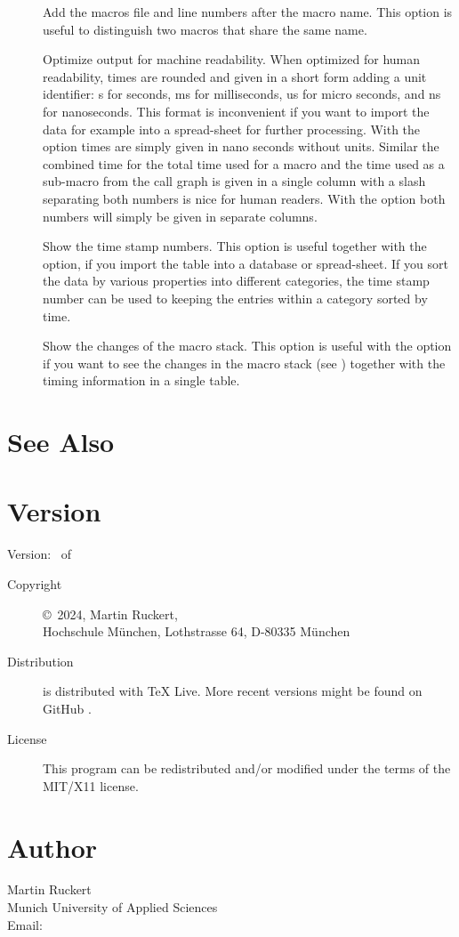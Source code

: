 \documentclass[a4paper,english]{article}
\begin{document}
\begin{description}
\item[]
  Add the macros file and line numbers after the macro name.
  This option is useful to distinguish two macros that share
  the same name.
\item[]
  Optimize output for machine readability. When optimized for human readability,
  times are rounded and given in a short form adding a unit identifier:
  s for seconds, ms for milliseconds, us for micro seconds, and ns for
  nanoseconds. This format is inconvenient if you want to import the data
  for example into a spread-sheet for further processing.
  With the  option times are simply given in nano seconds without units.
  Similar the combined time for the total time used for a macro and the
  time used as a sub-macro from the call graph is given in a single column
  with a slash separating both numbers is nice for human readers.
  With the  option both numbers will simply be given in separate columns.
  
\item[]
  Show the time stamp numbers. This option is useful together with
  the  option, if you import the table into a database or spread-sheet.
  If you sort the data by various properties into different
  categories, the time stamp number can be used to keeping the entries
   within a category sorted by time.
  
\item[]
  Show the changes of the macro stack.
  This option is useful with the  option if you want to see the changes
  in the macro stack (see ) together with the timing information in
  a single table.
\end{description}


\section{See Also}


\section{Version}
Version: \Version\  of \Date
\begin{description}
\item[Copyright] \copyright\ 2024, Martin Ruckert,\\
     Hochschule München, Lothstrasse 64, D-80335 München

\item[Distribution]
   is distributed with TeX Live.
  More recent versions might be found on GitHub
  .

\item[License] This program can be redistributed and/or modified under the
  terms of the MIT/X11 license.
\end{description}

\section{Author}
\noindent
Martin Ruckert                        \\
Munich University of Applied Sciences \\
Email:   \\
\end{document}
